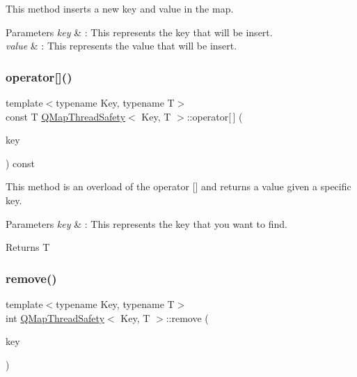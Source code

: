 This method inserts a new key and value in the map. 


\begin{DoxyParams}{Parameters}
{\em key} & \+: This represents the key that will be insert. \\
\hline
{\em value} & \+: This represents the value that will be insert. \\
\hline
\end{DoxyParams}
\mbox{\label{class_q_map_thread_safety_a0cdacf0e7048c4ef7e0960a371c32668}} 
\subsubsection{\texorpdfstring{operator[]()}{operator[]()}}
{\footnotesize\ttfamily template$<$typename Key, typename T$>$ \\
const T \mbox{\hyperlink{class_q_map_thread_safety}{Q\+Map\+Thread\+Safety}}$<$ Key, T $>$\+::operator\mbox{[}$\,$\mbox{]} (\begin{DoxyParamCaption}\item[{const Key \&}]{key }\end{DoxyParamCaption}) const\hspace{0.3cm}{\ttfamily [inline]}}



This method is an overload of the operator \mbox{[}\mbox{]} and returns a value given a specific key. 


\begin{DoxyParams}{Parameters}
{\em key} & \+: This represents the key that you want to find. \\
\hline
\end{DoxyParams}
\begin{DoxyReturn}{Returns}
T 
\end{DoxyReturn}
\mbox{\label{class_q_map_thread_safety_a91e703ad03572023876108c2b7bc3540}} 
\subsubsection{\texorpdfstring{remove()}{remove()}}
{\footnotesize\ttfamily template$<$typename Key, typename T$>$ \\
int \mbox{\hyperlink{class_q_map_thread_safety}{Q\+Map\+Thread\+Safety}}$<$ Key, T $>$\+::remove (\begin{DoxyParamCaption}\item[{const Key \&}]{key }\end{DoxyParamCaption})\hspace{0.3cm}{\ttfamily [inline]}}



